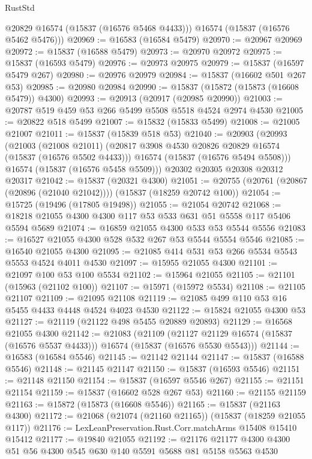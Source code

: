 \begin{lexlean}{RustStd}
\begin{coremodule}
        @20829
        @16574
        (@15837 (@16576 @5468 @4433)))
      @16574
      (@15837 (@16576 @5462 @5476)))
@20969 := @16583 (@16584 @5479)
@20970 := @20967 @20969
@20972 := @15837 (@16588 @5479)
@20973 := @20970 @20972
@20975 := @15837 (@16593 @5479)
@20976 := @20973 @20975
@20979 := @15837 (@16597 @5479 @267)
@20980 := @20976 @20979
@20984 := @15837 (@16602 @501 @267 @53)
@20985 := @20980 @20984
@20990 := @15837 (@15872 (@15873 (@16608 @5479)) @4300)
@20993 := @20913 (@20917 (@20985 @20990))
@21003 := @20787 @519 @459 @53 @266 @5499 @5508 @5518 @4524 @2974 @4530
@21005 := @20822 @518 @5499
@21007 := @15832 (@15833 @5499)
@21008 := @21005 @21007
@21011 := @15837 (@15839 @518 @53)
@21040 := @20903
    (@20993
      (@21003
        (@21008 @21011)
        (@20817 @3908 @4530 @20826 @20829 @16574 (@15837 (@16576 @5502 @4433)))
        @16574
        (@15837 (@16576 @5494 @5508)))
      @16574
      (@15837 (@16576 @5458 @5509)))
    @20302
    @20305
    @20308
    @20312
    @20317
@21042 := @15837 (@20321 @4300)
@21051 := @20755 (@20761 (@20867 (@20896 (@21040 @21042)))) (@15837 (@18259 @20742 @100))
@21054 := @15725 (@19496 (@17805 @19498))
@21055 := @21054 @20742
@21068 := @18218 @21055 @4300 @4300 @117 @53 @533 @631 @51 @5558 @117 @5406 @5594 @5689
@21074 := @16859 @21055 @4300 @533 @53 @5544 @5556
@21083 := @16527 @21055 @4300 @528 @532 @267 @53 @5544 @5554 @5546
@21085 := @16540 @21055 @4300
@21095 := @21085 @414 @531 @53 @266 @5534 @5543 @5553 @4524 @4011 @4530
@21097 := @15955 @21055 @4300
@21101 := @21097 @100 @53 @100 @5534
@21102 := @15964 @21055
@21105 := @21101 (@15963 (@21102 @100))
@21107 := @15971 (@15972 @5534)
@21108 := @21105 @21107
@21109 := @21095 @21108
@21119 := @21085 @499 @110 @53 @16 @5455 @4433 @4448 @4524 @4023 @4530
@21122 := @15824 @21055 @4300 @53
@21127 := @21119 (@21122 @498 @5455 @20889 @20893)
@21129 := @16568 @21055 @4300
@21142 := @21083
    (@21109
      (@21127 @21129 @16574 (@15837 (@16576 @5537 @4433)))
      @16574
      (@15837 (@16576 @5530 @5543)))
@21144 := @16583 (@16584 @5546)
@21145 := @21142 @21144
@21147 := @15837 (@16588 @5546)
@21148 := @21145 @21147
@21150 := @15837 (@16593 @5546)
@21151 := @21148 @21150
@21154 := @15837 (@16597 @5546 @267)
@21155 := @21151 @21154
@21159 := @15837 (@16602 @528 @267 @53)
@21160 := @21155 @21159
@21163 := @15872 (@15873 (@16608 @5546))
@21165 := @15837 (@21163 @4300)
@21172 := @21068 (@21074 (@21160 @21165)) (@15837 (@18259 @21055 @117))
@21176 := LexLeanPreservation.Rust.Corr.matchArms @15408 @15410 @15412
@21177 := @19840 @21055
@21192 := @21176 @21177 @4300 @4300 @51 @56 @4300 @545 @630 @140 @5591 @5688 @81 @5158 @5563 @4530

\end{coremodule}
\end{lexlean}
